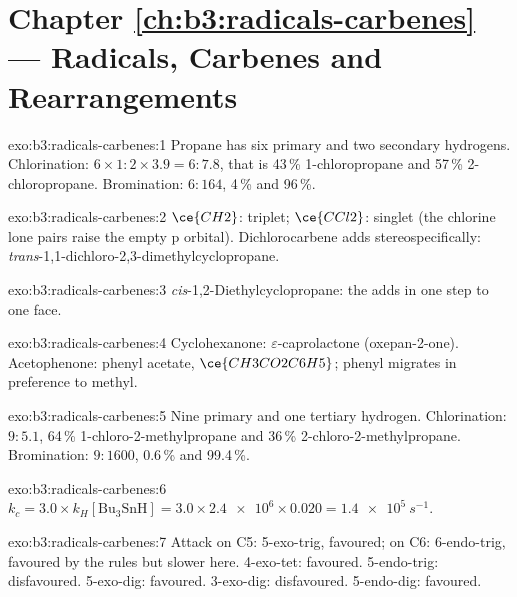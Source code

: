 \section*{Chapter \ref{ch:b3:radicals-carbenes} --- Radicals, Carbenes and Rearrangements}

\begin{solution}{exo:b3:radicals-carbenes:1}
Propane has six primary and two secondary hydrogens. Chlorination: $6 \times 1 : 2 \times 3.9 = 6 : 7.8$,
that is 43\,\% 1-chloropropane and 57\,\% 2-chloropropane. Bromination: $6 : 164$, 4\,\% and
96\,\%.
\end{solution}

\begin{solution}{exo:b3:radicals-carbenes:2}
$\ce{CH2}$: triplet; $\ce{CCl2}$: singlet (the chlorine lone pairs raise the empty p orbital).
Dichlorocarbene adds stereospecifically: \textit{trans}-1,1-dichloro-2,3-dimethylcyclopropane.
\end{solution}

\begin{solution}{exo:b3:radicals-carbenes:3}
\textit{cis}-1,2-Diethylcyclopropane: the  adds in one step to one face.
\end{solution}

\begin{solution}{exo:b3:radicals-carbenes:4}
Cyclohexanone: $\varepsilon$-caprolactone (oxepan-2-one). Acetophenone: phenyl acetate,
$\ce{CH3CO2C6H5}$; phenyl migrates in preference to methyl.
\end{solution}

\begin{solution}{exo:b3:radicals-carbenes:5}
Nine primary and one tertiary hydrogen. Chlorination: $9 : 5.1$, 64\,\% 1-chloro-2-methylpropane
and 36\,\% 2-chloro-2-methylpropane. Bromination: $9 : 1600$, 0.6\,\% and 99.4\,\%.
\end{solution}

\begin{solution}{exo:b3:radicals-carbenes:6}
$k_c = 3.0 \times k_H[\mathrm{Bu_3SnH}] = 3.0 \times \num{2.4e6} \times 0.020 = \qty{1.4e5}{s^{-1}}$.
\end{solution}

\begin{solution}{exo:b3:radicals-carbenes:7}
Attack on C5: 5-exo-trig, favoured; on C6: 6-endo-trig, favoured by the rules but
slower here. 4-exo-tet: favoured. 5-endo-trig: disfavoured. 5-exo-dig: favoured.
3-exo-dig: disfavoured. 5-endo-dig: favoured.
\end{solution}

